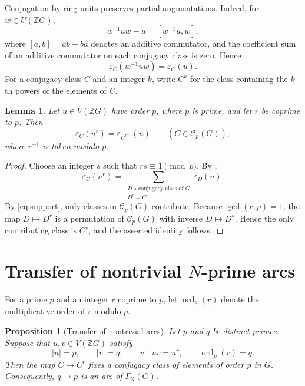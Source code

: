 \documentclass[11pt,a4paper]{article}
\newtheorem{proposition}[theorem]{Proposition}
\newtheorem{lemma}[theorem]{Lemma}
\theoremstyle{remark}
\newcommand{\VZG}{V(\mathbb ZG)}
\newcommand{\GN}{\Gamma_{\mathrm N}}
\newcommand{\eps}{\varepsilon}
\begin{document}
Conjugation by ring units preserves partial augmentations. Indeed, for
$w\in U(\mathbb ZG)$,
\[
 w^{-1}uw-u=[w^{-1}u,w],
\]
where $[a,b]=ab-ba$ denotes an additive commutator, and the coefficient sum
of an additive commutator on each conjugacy class is zero. Hence
\begin{equation}\label{eq:conjugation}
 \eps_C(w^{-1}uw)=\eps_C(u).
\end{equation}
For a conjugacy class $C$ and an integer $k$, write $C^k$ for the class
containing the $k$th powers of the elements of $C$.

\begin{lemma}\label{lem:power}
Let $u\in\VZG$ have order $p$, where $p$ is prime, and let $r$ be coprime
to $p$. Then
\[
 \eps_C(u^r)
 =
 \eps_{C^{r^{-1}}}(u)
 \qquad
 (C\in\mathcal C_p(G)),
\]
where $r^{-1}$ is taken modulo $p$.
\end{lemma}

\begin{proof}
Choose an integer $s$ such that $rs\equiv1\pmod p$. By
\cite[Lemma~3.2(a)]{PAP},
\[
 \eps_C(u^r)
 =
 \sum_{\substack{D\ \text{a conjugacy class of }G\\ D^r=C}}
 \eps_D(u).
\]
By \eqref{eq:support}, only classes in $\mathcal C_p(G)$ contribute.
Because $\gcd(r,p)=1$, the map $D\mapsto D^r$ is a permutation of
$\mathcal C_p(G)$ with inverse $D\mapsto D^s$. Hence the only contributing
class is $C^s$, and the asserted identity follows.
\end{proof}

\section{Transfer of nontrivial \texorpdfstring{$N$}{N}-prime arcs}

For a prime $p$ and an integer $r$ coprime to $p$, let
$\operatorname{ord}_p(r)$ denote the multiplicative order of $r$ modulo
$p$.

\begin{proposition}[Transfer of nontrivial arcs]\label{prop:transfer}
Let $p$ and $q$ be distinct primes. Suppose that $u,v\in\VZG$ satisfy
\[
 |u|=p,\qquad |v|=q,\qquad v^{-1}uv=u^r,
 \qquad \operatorname{ord}_p(r)=q.
\]
Then the map $C\mapsto C^r$ fixes a conjugacy class of elements of order
$p$ in $G$. Consequently, $q\to p$ is an arc of $\GN(G)$.
\end{proposition}
\end{document}
